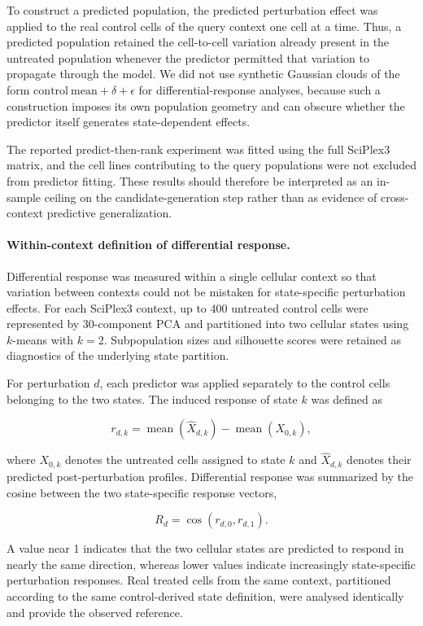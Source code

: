 \documentclass[11pt,letterpaper]{article}
\begin{document}
To construct a predicted population, the predicted perturbation effect was applied to the real
control cells of the query context one cell at a time. Thus, a predicted population retained the
cell-to-cell variation already present in the untreated population whenever the predictor permitted
that variation to propagate through the model. We did not use synthetic Gaussian clouds of the form
$\mathrm{control\ mean}+\delta+\epsilon$ for differential-response analyses, because such a
construction imposes its own population geometry and can obscure whether the predictor itself
generates state-dependent effects.

The reported predict-then-rank experiment was fitted using the full SciPlex3 matrix, and the cell
lines contributing to the query populations were not excluded from predictor fitting. These results
should therefore be interpreted as an in-sample ceiling on the candidate-generation step rather
than as evidence of cross-context predictive generalization.

\paragraph{Within-context definition of differential response.}
Differential response was measured within a single cellular context so that variation between
contexts could not be mistaken for state-specific perturbation effects. For each SciPlex3 context,
up to 400 untreated control cells were represented by 30-component PCA and partitioned into two
cellular states using $k$-means with $k=2$. Subpopulation sizes and silhouette scores were retained
as diagnostics of the underlying state partition.

For perturbation $d$, each predictor was applied separately to the control cells belonging to the
two states. The induced response of state $k$ was defined as

$$
r_{d,k}
=
\operatorname{mean}
\left(
\widehat{X}_{d,k}
\right)
-
\operatorname{mean}
\left(
X_{0,k}
\right),
$$

where $X_{0,k}$ denotes the untreated cells assigned to state $k$ and
$\widehat{X}_{d,k}$ denotes their predicted post-perturbation profiles. Differential response was
summarized by the cosine between the two state-specific response vectors,

$$
R_d
=
\cos
\left(
r_{d,0},
r_{d,1}
\right).
$$

A value near 1 indicates that the two cellular states are predicted to respond in nearly the same
direction, whereas lower values indicate increasingly state-specific perturbation responses. Real
treated cells from the same context, partitioned according to the same control-derived state
definition, were analysed identically and provide the observed reference.
\end{document}
